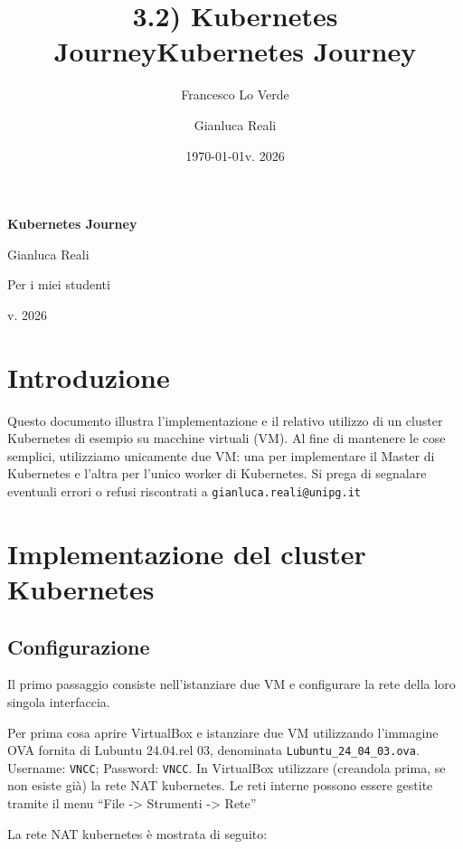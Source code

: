 \documentclass[11pt, a4paper]{article}
\title{3.2) Kubernetes Journey}
\date{\today}
\author{Francesco Lo Verde}
\begin{document}

\title{\textbf{Kubernetes Journey}}
\author{Gianluca Reali}
\date{v. 2026}

{\centering
\LARGE\textbf{Kubernetes Journey}\par
\vspace{0.5em}
\large Gianluca Reali\par
\vspace{0.3em}
\normalsize Per i miei studenti\par
\vspace{0.3em}
v. 2026\par
}

\vspace{1.5em}

\section*{Introduzione}

Questo documento illustra l'implementazione e il relativo utilizzo di un cluster Kubernetes di esempio su macchine virtuali (VM). Al fine di mantenere le cose semplici, utilizziamo unicamente due VM: una per implementare il Master di Kubernetes e l'altra per l'unico worker di Kubernetes. Si prega di segnalare eventuali errori o refusi riscontrati a \texttt{gianluca.reali@unipg.it}

\section{Implementazione del cluster Kubernetes}

\subsection{Configurazione}

Il primo passaggio consiste nell'istanziare due VM e configurare la rete della loro singola interfaccia.

Per prima cosa aprire VirtualBox e istanziare due VM utilizzando l'immagine OVA fornita di Lubuntu 24.04.rel 03, denominata \texttt{Lubuntu\_24\_04\_03.ova}. Username: \texttt{VNCC}; Password: \texttt{VNCC}. In VirtualBox utilizzare (creandola prima, se non esiste già) la rete NAT kubernetes. Le reti interne possono essere gestite tramite il menu ``File -> Strumenti -> Rete''

La rete NAT kubernetes è mostrata di seguito:
\end{document}
